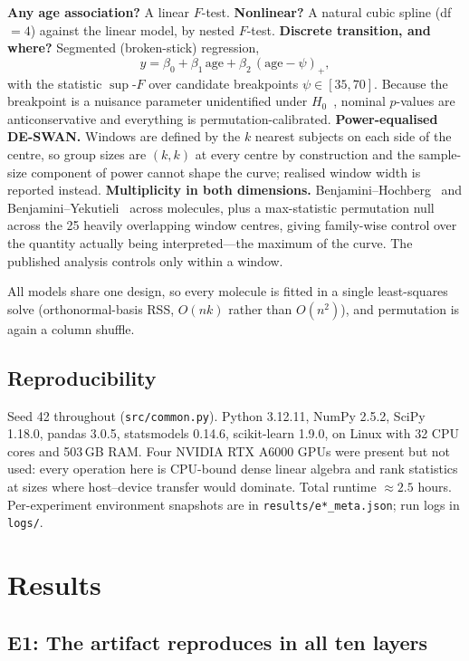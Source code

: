 \documentclass{article}
\begin{document}
\textbf{Any age association?} A linear $F$-test. \textbf{Nonlinear?} A natural cubic spline (df $=4$) against the linear model, by nested $F$-test. \textbf{Discrete transition, and where?} Segmented (broken-stick) regression,
\[
y = \beta_0 + \beta_1\,\mathrm{age} + \beta_2\,(\mathrm{age}-\psi)_{+},
\]
with the statistic $\sup$-$F$ over candidate breakpoints $\psi\in[35,70]$. Because the breakpoint is a nuisance parameter unidentified under $H_0$~\cite{davies1987}, nominal $p$-values are anticonservative and everything is permutation-calibrated. \textbf{Power-equalised DE-SWAN.} Windows are defined by the $k$ nearest subjects on each side of the centre, so group sizes are $(k,k)$ at every centre by construction and the sample-size component of power cannot shape the curve; realised window width is reported instead. \textbf{Multiplicity in both dimensions.} Benjamini--Hochberg~\cite{bh1995} and Benjamini--Yekutieli~\cite{by2001} across molecules, plus a max-statistic permutation null across the 25 heavily overlapping window centres, giving family-wise control over the quantity actually being interpreted---the maximum of the curve. The published analysis controls only within a window.

All models share one design, so every molecule is fitted in a single least-squares solve (orthonormal-basis RSS, $O(nk)$ rather than $O(n^2)$), and permutation is again a column shuffle.

\subsection{Reproducibility}

Seed 42 throughout (\texttt{src/common.py}). Python 3.12.11, NumPy 2.5.2, SciPy 1.18.0, pandas 3.0.5, statsmodels 0.14.6, scikit-learn 1.9.0, on Linux with 32 CPU cores and 503\,GB RAM. Four NVIDIA RTX A6000 GPUs were present but not used: every operation here is CPU-bound dense linear algebra and rank statistics at sizes where host--device transfer would dominate. Total runtime ${\approx}2.5$ hours. Per-experiment environment snapshots are in \texttt{results/e*\_meta.json}; run logs in \texttt{logs/}.

\section{Results}

\subsection{E1: The artifact reproduces in all ten layers}
\end{document}

